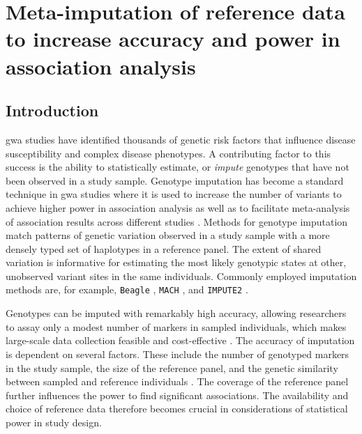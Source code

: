 
\glsresetall




{
\singlespacing
\chapter{Meta-imputation of reference data to increase accuracy and power in association analysis}
\label{ch:metaimpute}
\minitoc
}


%
\section{Introduction}
%


\Gls{gwa} studies have identified thousands of genetic risk factors that influence disease susceptibility and complex disease phenotypes.
A contributing factor to this success is the ability to statistically estimate, or \emph{impute} genotypes that have not been observed in a study sample.
Genotype imputation has become a standard technique in \gls{gwa} studies where it is used to increase the number of variants to achieve higher power in association analysis as well as to facilitate meta-analysis of association results across different studies \citep{Marchini:2007bg, Marchini:2010cga}.
Methods for genotype imputation match patterns of genetic variation observed in a study sample with a more densely typed set of haplotypes in a reference panel.
The extent of shared variation is informative for estimating the most likely genotypic states at other, unobserved variant sites in the same individuals.
Commonly employed imputation methods are, for example, \texttt{Beagle} \citep{Browning:2016iy}, \texttt{MACH} \citep{Li:2010kx}, and \texttt{IMPUTE2} \citep{Howie:2009hq,Howie:2011ia}.

Genotypes can be imputed with remarkably high accuracy, allowing researchers to assay only a modest number of markers in sampled individuals, which makes large-scale data collection feasible and cost-effective \citep{Li:2009kfa}.
The accuracy of imputation is dependent on several factors.
These include the number of genotyped markers in the study sample,
the size of the reference panel, and the genetic similarity between sampled and reference individuals \citep{Howie:2009hq, Roshyara:2015gi}.
The coverage of the reference panel further influences the power to find significant associations.
The availability and choice of reference data therefore becomes crucial in considerations of statistical power in study design.

